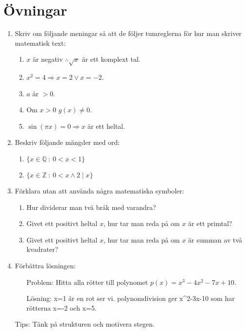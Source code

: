 \documentclass[titlepage]{article}
\begin{document}
\section{Övningar}
\begin{enumerate}
    \item Skriv om följande meningar så att de följer tumreglerna för hur man skriver matematisk text:
    \begin{enumerate}[label=(\alph*)]
        \item $x$ är negativ $\therefore \sqrt{x}$ är ett komplext tal.
        \item $x^2 = 4 \Rightarrow x=2 \vee x=-2$.
        \item $a$ är $>0$.
        \item Om $x>0$ $g(x) \neq 0$.
        \item $\sin(\pi x)= 0\Rightarrow x$ är ett heltal. 
    \end{enumerate}
    \item Beskriv följande mängder med ord:
    \begin{enumerate}
        \item $\{x \in \mathbb{Q} \: : \: 0<x<1\}$
        \item $\{x \in \mathbb{Z} \: : \: 0 < x \wedge 2 \mid x\}$
    \end{enumerate}
    \item Förklara utan att använda några matematiska symboler:
    \begin{enumerate}[label=(\alph*)]
        \item Hur dividerar man två bråk med varandra?
        \item Givet ett positivt heltal $x$, hur tar man reda på om $x$ är ett primtal?
        \item Givet ett positivt heltal $x$, hur tar man reda på om $x$ är summan av två kvadrater?
    \end{enumerate}
    \item Förbättra lösningen:
    \begin{enumerate}[leftmargin=20mm]
        \item[Problem:] Hitta alla rötter till polynomet $p(x)=x^3 - 4x^2 - 7x + 10$.
        \item[Lösning:] x=1 är en rot ser vi. polynomdivision ger x\textasciicircum2-3x-10 som har rötterna x=-2 och x=5.
    \end{enumerate}
    Tips: Tänk på strukturen och motivera stegen.
\end{enumerate}


\newpage

\end{document}
